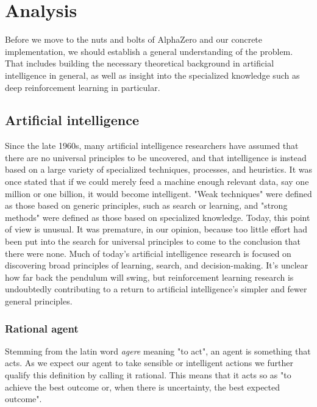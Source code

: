 \chapter{Analysis}
Before we move to the nuts and bolts of AlphaZero and our concrete implementation, we should establish a general understanding of the problem. That includes building the necessary theoretical background in artificial intelligence in general, as well as insight into the specialized knowledge such as deep reinforcement learning in particular.

\section{Artificial intelligence}
Since the late 1960s, many artificial intelligence researchers have assumed that there are no universal principles to be uncovered, and that intelligence is instead based on a large variety of specialized techniques, processes, and heuristics. It was once stated that if we could merely feed a machine enough relevant data, say one million or one billion, it would become intelligent. "Weak techniques" were defined as those based on generic principles, such as search or learning, and "strong methods" were defined as those based on specialized knowledge. Today, this point of view is unusual. It was premature, in our opinion, because too little effort had been put into the search for universal principles to come to the conclusion that there were none. Much of today's artificial intelligence research is focused on discovering broad principles of learning, search, and decision-making. It's unclear how far back the pendulum will swing, but reinforcement learning research is undoubtedly contributing to a return to artificial intelligence's simpler and fewer general principles. \cite{sutton_reinforcement_2018}


\subsection{Rational agent}
Stemming from the latin word \textit{agere} meaning "to act", an agent is something that acts. As we expect our agent to take sensible or intelligent actions we further qualify this definition by calling it rational. This means that it acts so as "to achieve the best outcome or, when there is uncertainty, the best expected outcome". \cite[p. 36]{russell_artificial_2021}

